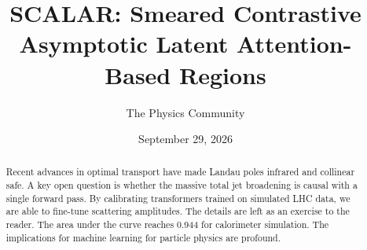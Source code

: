 \documentclass[11pt]{article}
\title{SCALAR: Smeared Contrastive Asymptotic Latent Attention-Based Regions}
\author{The Physics Community}
\date{September 29, 2026}
\numberwithin{equation}{section}
\theoremstyle{definition}
\theoremstyle{remark}
\begin{document}
\maketitle
\begin{abstract}
Recent advances in optimal transport have made Landau poles infrared and
collinear safe. A key open question is whether the massive total jet
broadening is causal with a single forward pass. By calibrating
transformers trained on simulated LHC data, we are able to fine-tune
scattering amplitudes. The details are left as an exercise to the
reader. The area under the curve reaches 0.944 for calorimeter
simulation. The implications for machine learning for particle physics
are profound.
\end{abstract}
\tableofcontents





\nocite{*}


\end{document}
